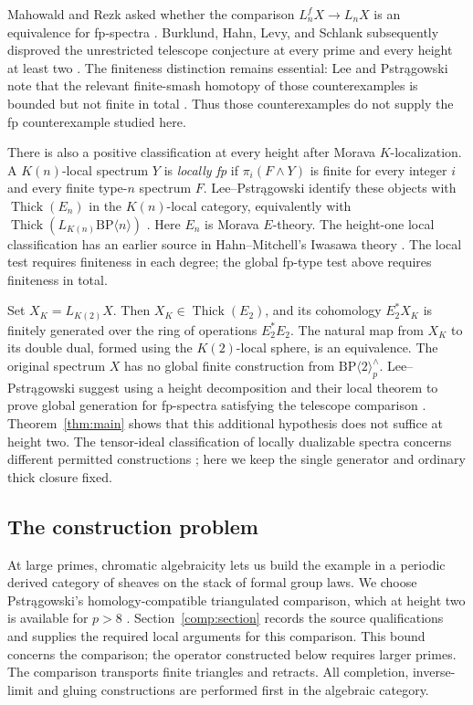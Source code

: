 \documentclass[11pt]{article}
\DeclareMathOperator{\Thick}{Thick}
\newcommand{\BP}{\mathrm{BP}}
\theoremstyle{definition}
\theoremstyle{remark}
\numberwithin{equation}{section}
\begin{document}
Mahowald and Rezk asked whether the comparison
$L_n^fX\to L_nX$ is an equivalence for fp-spectra
\cite[Conjecture~7.3]{MR1999}.
Burklund, Hahn, Levy, and Schlank subsequently disproved the unrestricted
telescope conjecture at every prime and every height at least two
\cite[Theorem~A]{BHLS2023}.
The finiteness distinction remains essential: Lee and Pstr\k{a}gowski
note that the relevant finite-smash homotopy of those counterexamples is
bounded but not finite in total
\cite[Section~1.1, following Conjecture~1.2]{LP2026}.
Thus those counterexamples do not supply the fp counterexample studied here.

There is also a positive classification at every height after Morava
$K$-localization. A $K(n)$-local spectrum $Y$ is \emph{locally fp}
if $\pi_i(F\wedge Y)$ is finite for every integer $i$ and every
finite type-$n$ spectrum $F$. Lee--Pstr\k{a}gowski identify these
objects with $\Thick(E_n)$ in the $K(n)$-local category, equivalently
with $\Thick(L_{K(n)}\BP\langle n\rangle)$
\cite[Theorems~1.7 and~4.3]{LP2026}. Here $E_n$ is Morava
$E$-theory. The height-one local classification has an earlier source
in Hahn--Mitchell's Iwasawa theory \cite[Theorem~8.1]{HM2007}.
The local test requires finiteness in each degree; the global fp-type
test above requires finiteness in total.

Set $X_K=L_{K(2)}X$. Then $X_K\in\Thick(E_2)$, and its cohomology
$E_2^*X_K$ is finitely generated over the ring of operations $E_2^*E_2$.
The natural map from $X_K$ to its double dual, formed using the
$K(2)$-local sphere, is an equivalence. The original
spectrum $X$ has no global finite construction from
$\BP\langle2\rangle_p^\wedge$.
Lee--Pstr\k{a}gowski suggest using a height decomposition and their
local theorem to prove global generation for fp-spectra satisfying
the telescope comparison \cite[Remark~5.1]{LP2026}.
Theorem~\ref{thm:main} shows that this additional hypothesis does not
suffice at height two. The tensor-ideal classification of locally
dualizable spectra concerns different permitted constructions
\cite{BHN2022}; here we keep the single generator and ordinary thick
closure fixed.

\subsection{The construction problem}

At large primes, chromatic algebraicity lets us build the example in a
periodic derived category of sheaves on the stack of formal group laws.
We choose Pstr\k{a}gowski's homology-compatible triangulated comparison,
which at height two is available for $p>8$
\cite[Corollary~6.9]{Pstragowski2021}.
Section~\ref{comp:section} records the source qualifications and supplies
the required local arguments for this comparison.
This bound concerns the comparison; the operator constructed below
requires larger primes. The comparison transports finite triangles and
retracts. All completion, inverse-limit and gluing constructions are
performed first in the algebraic category.
\end{document}
